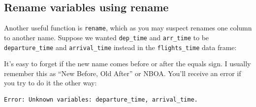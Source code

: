 \documentclass[]{tufte-book}
\newenvironment{Shaded}{\begin{snugshade}}{\end{snugshade}}
\newcommand{\KeywordTok}[1]{\textcolor[rgb]{0.13,0.29,0.53}{\textbf{{#1}}}}
\newcommand{\DataTypeTok}[1]{\textcolor[rgb]{0.13,0.29,0.53}{{#1}}}
\newcommand{\StringTok}[1]{\textcolor[rgb]{0.31,0.60,0.02}{{#1}}}
\newcommand{\NormalTok}[1]{{#1}}
\begin{document}
\begin{Shaded}
\end{Shaded}

\begin{Shaded}
\end{Shaded}

\subsection{Rename variables using rename}\label{rename}

Another useful function is \texttt{rename}, which as you may suspect
renames one column to another name. Suppose we wanted \texttt{dep\_time}
and \texttt{arr\_time} to be \texttt{departure\_time} and
\texttt{arrival\_time} instead in the \texttt{flights\_time} data frame:

\begin{Shaded}
\end{Shaded}

It's easy to forget if the new name comes before or after the equals
sign. I usually remember this as ``New Before, Old After'' or NBOA.
You'll receive an error if you try to do it the other way:

\begin{verbatim}
Error: Unknown variables: departure_time, arrival_time.
\end{verbatim}
\end{document}
